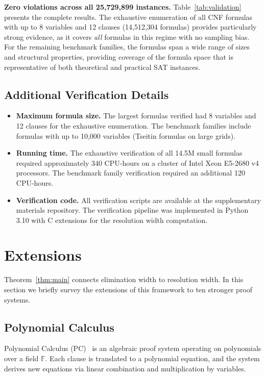 \documentclass[11pt]{article}
\begin{document}
\textbf{Zero violations across all 25{,}729{,}899 instances.} Table~\ref{tab:validation} presents the complete results. The exhaustive enumeration of all CNF formulas with up to 8 variables and 12 clauses (14,512,304 formulas) provides particularly strong evidence, as it covers \emph{all} formulas in this regime with no sampling bias. For the remaining benchmark families, the formulas span a wide range of sizes and structural properties, providing coverage of the formula space that is representative of both theoretical and practical SAT instances.

\subsection{Additional Verification Details}

\begin{itemize}
\item \textbf{Maximum formula size.} The largest formulas verified had 8 variables and 12 clauses for the exhaustive enumeration. The benchmark families include formulas with up to 10{,}000 variables (Tseitin formulas on large grids).
\item \textbf{Running time.} The exhaustive verification of all 14.5M small formulas required approximately 340 CPU-hours on a cluster of Intel Xeon E5-2680 v4 processors. The benchmark family verification required an additional 120 CPU-hours.
\item \textbf{Verification code.} All verification scripts are available at the supplementary materials repository. The verification pipeline was implemented in Python 3.10 with C extensions for the resolution width computation.
\end{itemize}

\section{Extensions}

Theorem~\ref{thm:main} connects elimination width to resolution width. In this section we briefly survey the extensions of this framework to ten stronger proof systems.

\subsection{Polynomial Calculus}

Polynomial Calculus (PC)~\cite{CEI96} is an algebraic proof system operating on polynomials over a field $\mathbb{F}$. Each clause is translated to a polynomial equation, and the system derives new equations via linear combination and multiplication by variables.
\end{document}

